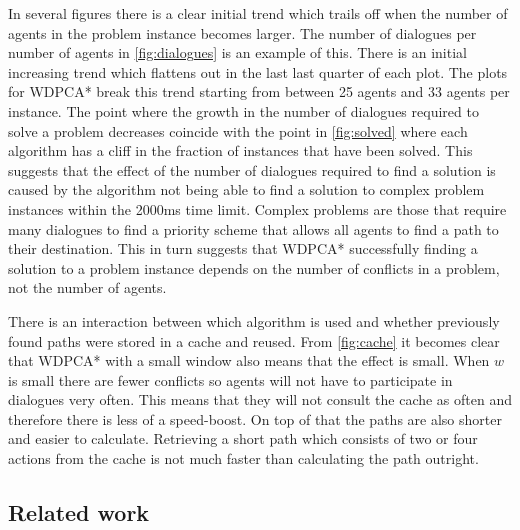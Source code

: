 In several figures there is a clear initial trend which trails off when the
number of agents in the problem instance becomes larger. The number of
dialogues per number of agents in \autoref{fig:dialogues} is an example of
this. There is an initial increasing trend which flattens out in the last last
quarter of each plot. The plots for WDPCA* break this trend starting
from between 25 agents and 33 agents per instance. The point where the growth
in the number of dialogues required to solve a problem decreases coincide with
the point in \autoref{fig:solved} where each algorithm has a cliff in the
fraction of instances that have been solved. This suggests that the effect of
the number of dialogues required to find a solution is caused by the algorithm
not being able to find a
solution to complex problem instances within the 2000ms time limit. Complex
problems are those that require many dialogues to find a priority scheme that
allows all agents to find a path to their destination. This in turn suggests
that WDPCA* successfully finding a solution to a problem instance depends on the
number of conflicts in a problem, not the number of agents.

There is an interaction between which algorithm is used and whether previously
found paths were stored in a cache and reused. From \autoref{fig:cache} it
becomes clear that WDPCA* with a small window also means that the effect is
small. When $w$ is small there are fewer conflicts so agents will not have
to participate in dialogues very often. This means that they will not consult
the cache as often and therefore there is less of a speed-boost. On top of that
the paths are also shorter and easier to calculate. Retrieving a short path
which consists of two or four actions from the cache is not much faster than 
calculating the path outright.

\subsection{Related work}

